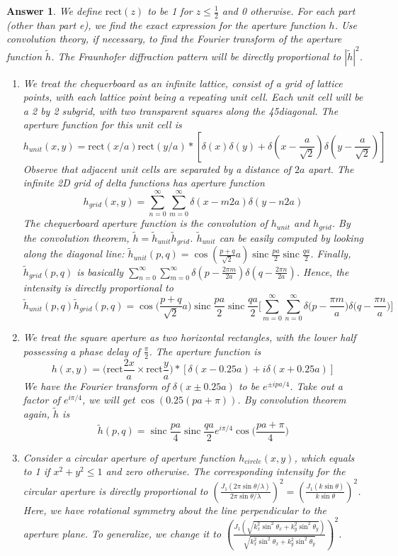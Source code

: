\documentclass[a4paper]{article}
\DeclareMathOperator{\sinc}{sinc}
\newtheorem{ans}{Answer}[section]
\theoremstyle{new}
\begin{document}
\newpage
\begin{ans} We define $\text{rect}(z)$ to be 1 for $z\leq\frac{1}{2}$ and 0 otherwise. For each part (other than part e), we find the exact expression for the aperture function $h$. Use convolution theory, if necessary, to find the Fourier transform of the aperture function $\tilde{h}$. The Fraunhofer diffraction pattern will be directly proportional to $|\tilde{h}|^2$.
\begin{enumerate}[label=(\alph*)]
\item We treat the chequerboard as an infinite lattice, consist of a grid of lattice points, with each lattice point being a repeating unit cell. Each unit cell will be a 2 by 2 subgrid, with two transparent squares along the 45\degree diagonal. The aperture function for this unit cell is
$$h_{unit}(x,y)=\text{rect}(x/a)\text{rect}(y/a)*[\delta(x)\delta(y)+\delta(x-\frac{a}{\sqrt{2}})\delta(y-\frac{a}{\sqrt{2}})]$$
Observe that adjacent unit cells are separated by a distance of $2a$ apart. The infinite 2D grid of delta functions has aperture function
$$h_{grid}(x,y)=\sum_{n=0}^\infty\sum_{m=0}^\infty\delta(x-m2a)\delta(y-n2a)$$
The chequerboard aperture function is the convolution of $h_{unit}$ and $h_{grid}$. By the convolution theorem, $\tilde{h}=\tilde{h}_{unit}\tilde{h}_{grid}$. $\tilde{h}_{unit}$ can be easily computed by looking along the diagonal line: $\tilde{h}_{unit}(p,q)=\cos(\frac{p+q}{\sqrt{2}}a)\sinc\frac{pa}{2}\sinc\frac{qa}{2}$. Finally, $\tilde{h}_{grid}(p,q)$ is basically $\sum_{n=0}^\infty\sum_{m=0}^\infty\delta(p-\frac{2\pi m}{2a})\delta(q-\frac{2\pi n}{2a})$. Hence, the intensity is directly proportional to 
$$\tilde{h}_{unit}(p,q)\tilde{h}_{grid}(p,q)=\cos\bigg(\frac{p+q}{\sqrt{2}}a\bigg)\sinc\frac{pa}{2}\sinc\frac{qa}{2}\bigg[\sum_{m=0}^\infty\sum_{n=0}^\infty\delta\bigg(p-\frac{\pi m}{a}\bigg)\delta\bigg(q-\frac{\pi n}{a}\bigg)\bigg]$$
\item We treat the square aperture as two horizontal rectangles, with the lower half possessing a phase delay of $\frac{\pi}{2}$. The aperture function is 
$$h(x,y)=\bigg(\text{rect}\frac{2x}{a}\times\text{rect}\frac{y}{a}\bigg)*[\delta(x-0.25a)+i\delta(x+0.25a)]$$
We have the Fourier transform of $\delta(x\pm0.25a)$ to be $e^{\pm ipa/4}$. Take out a factor of $e^{i\pi/4}$, we will get $\cos(0.25(pa+\pi))$. By convolution theorem again, $\tilde{h}$ is
$$\tilde{h}(p,q)=\sinc\frac{pa}{4}\sinc\frac{qa}{2} e^{i\pi/4}\cos\bigg(\frac{pa+\pi}{4}\bigg)$$
\item Consider a circular aperture of aperture function $h_{circle}(x,y)$, which equals to 1 if $x^2+y^2\leq1$ and zero otherwise. The corresponding intensity for the circular aperture is directly proportional to $(\frac{J_1(2\pi\sin\theta/\lambda)}{2\pi \sin\theta/\lambda})^2=(\frac{J_1(k\sin\theta)}{k\sin\theta})^2$. Here, we have rotational symmetry about the line perpendicular to the aperture plane. To generalize, we change it to $(\frac{J_1(\sqrt{k_x^2\sin^2\theta_x+k_y^2\sin^2\theta_y})}{\sqrt{k_x^2\sin^2\theta_x+k_y^2\sin^2\theta_y}})^2$.\\[5pt]

\end{enumerate}
\end{ans}
\end{document}
